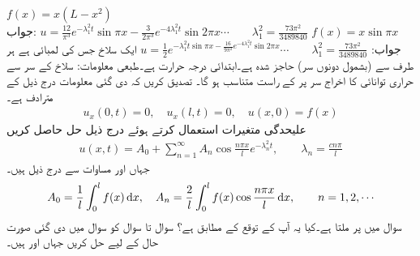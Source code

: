 \quad
$f(x)=x(L-x^2)$\\
جواب:\quad
$u=\tfrac{12}{\pi^3}e^{-\lambda_1^2t}\sin \pi x-\tfrac{3}{2\pi^3}e^{-4\lambda_1^2t}\sin 2\pi x\cdots\quad \quad \lambda_1^2=\tfrac{73\pi^2}{3489840}$
\quad
$f(x)=x\sin \pi x$\\
جواب:\quad
$u=\tfrac{1}{2}e^{-\lambda_1^2t\sin \pi x-\tfrac{16}{9\pi^2}e^{-4\lambda_1^2t}\sin 2\pi x}\cdots \quad \quad \lambda_1^2=\tfrac{73\pi^2}{3489840}$
\quad
ایک سلاخ جس کی لمبائی  ہے  ہر طرف سے (بشمول دونوں سر) حاجز شدہ ہے۔ابتدائی درجہ حرارت  ہے۔طبعی معلومات: سلاخ کے سر سے حراری توانائی کا اخراج سر پر   کے راست متناسب ہو گا۔ تصدیق کریں کہ دی گئی  معلومات درج ذیل کے مترادف ہے۔
\begin{align*}
u_x(0,t)=0,\quad u_x(l,t)=0,\quad u(x,0)=f(x)
\end{align*}
علیحدگی متغیرات استعمال کرتے ہوئے درج ذیل حل حاصل کریں
\begin{align*}
u(x,t)=A_0+\sum_{n=1}^{\infty} A_n\cos\frac{n\pi x}{l}e^{-\lambda_n^2 t},\quad \quad \lambda_n=\tfrac{cn\pi}{l}
\end{align*}
جہاں  اور  مساوات  سے  درج ذیل ہیں۔
\begin{align*}
A_0=\frac{1}{l}\int_0^l f(x)\dif x,\quad A_n=\frac{2}{l}\int_0^l f(x)\cos \frac{n\pi x}{l}\dif x,\quad \quad n=1,2,\cdots
\end{align*}
\quad
سوال  میں  پر  ملتا ہے۔کیا یہ آپ کے توقع کے مطابق ہے؟
سوال  تا سوال  کو سوال  میں دی گئی صورت حال کے لیے حل کریں جہاں   اور  ہیں۔

